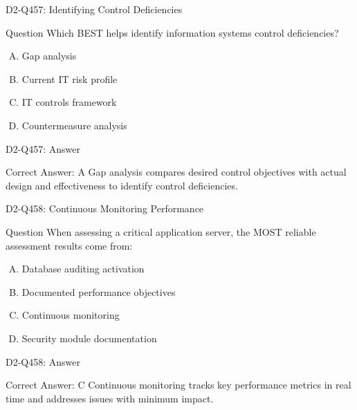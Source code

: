\documentclass{beamer}
\begin{document}
\begin{frame}{D2-Q457: Identifying Control Deficiencies}
	\begin{block}{Question}
		Which BEST helps identify information systems control deficiencies?
	\end{block}
	\begin{enumerate}[(A)]
		\item Gap analysis
		\item Current IT risk profile
		\item IT controls framework
		\item Countermeasure analysis
	\end{enumerate}
\end{frame}
\begin{frame}{D2-Q457: Answer}
	\begin{block}{Correct Answer: A}
		Gap analysis compares desired control objectives with actual design and effectiveness to identify control deficiencies.
	\end{block}
\end{frame}

\begin{frame}{D2-Q458: Continuous Monitoring Performance}
	\begin{block}{Question}
		When assessing a critical application server, the MOST reliable assessment results come from:
	\end{block}
	\begin{enumerate}[(A)]
		\item Database auditing activation
		\item Documented performance objectives
		\item Continuous monitoring
		\item Security module documentation
	\end{enumerate}
\end{frame}
\begin{frame}{D2-Q458: Answer}
	\begin{block}{Correct Answer: C}
		Continuous monitoring tracks key performance metrics in real time and addresses issues with minimum impact.
	\end{block}
\end{frame}
\end{document}
